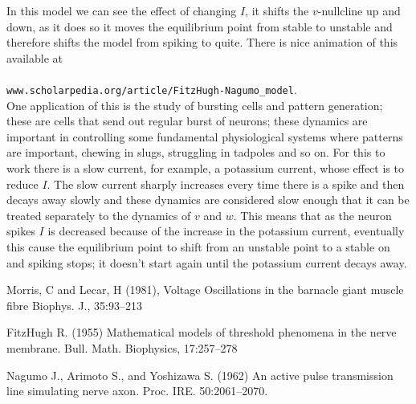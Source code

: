 \documentclass[12pt]{article}
\begin{document}
In this model we can see the effect of changing $I$, it shifts the
$v$-nullcline up and down, as it does so it moves the equilibrium
point from stable to unstable and therefore shifts the model from
spiking to quite. There is nice animation of this available at\\
\\
\texttt{www.scholarpedia.org/article/FitzHugh-Nagumo\_model}. \\

One application of this is the study of bursting cells and pattern
generation; these are cells that send out regular burst of neurons;
these dynamics are important in controlling some fundamental
physiological systems where patterns are important, chewing in slugs,
struggling in tadpoles and so on. For this to work there is a slow
current, for example, a potassium current, whose effect is to reduce
$I$. The slow current sharply increases every time there is a spike and
then decays away slowly and these dynamics are considered slow enough
that it can be treated separately to the dynamics of $v$ and $w$. This
means that as the neuron spikes $I$ is decreased because of the
increase in the potassium current, eventually this cause the
equilibrium point to shift from an unstable point to a stable on and
spiking stops; it doesn't start again until the potassium current decays away.

\begin{thebibliography}{99}
\newblock Morris, C and Lecar, H (1981),
\newblock Voltage Oscillations in the barnacle giant muscle fibre
\newblock Biophys. J., 35:93--213

\newblock FitzHugh R. (1955) 
\newblock Mathematical models of threshold phenomena in the nerve membrane. 
\newblock Bull. Math. Biophysics, 17:257--278

\newblock Nagumo J., Arimoto S., and Yoshizawa S. (1962) 
\newblock An active pulse transmission line simulating nerve axon. 
\newblock Proc. IRE. 50:2061--2070.

\end{thebibliography}
\end{document}
